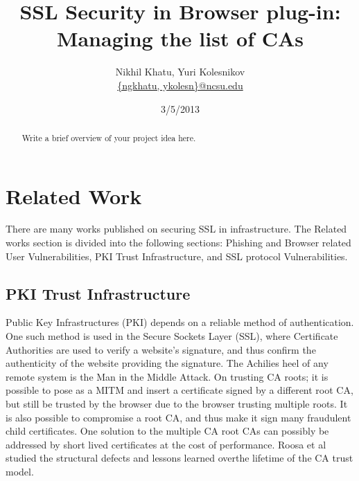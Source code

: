 \documentclass[10pt,twocolumn,pdftex]{article}
\title{SSL Security in Browser plug-in: Managing the list of CAs}
\author{Nikhil Khatu, Yuri Kolesnikov \\
\url{{ngkhatu, ykolesn}@ncsu.edu}}
\date{3/5/2013}
\begin{document}
\maketitle

\begin{abstract}
  Write a brief overview of your project idea here.
\end{abstract}

\newpage
\hspace{1em}
\newpage

\section{Related Work}

There are many works published on securing SSL in infrastructure. The Related works section is divided into the following sections: Phishing and Browser related User Vulnerabilities, PKI Trust Infrastructure, and SSL protocol Vulnerabilities.

\subsection{PKI Trust Infrastructure}

Public Key Infrastructures (PKI) depends on a reliable method of authentication.  One such method is used in the Secure Sockets Layer (SSL), where Certificate Authorities are used to verify a website's signature, and thus confirm the authenticity of the website providing the signature.  The Achilies heel of any remote system is the Man in the Middle Attack. On trusting CA roots; it is possible to pose as a MITM and insert a certificate signed by a different root CA, but still be trusted by the browser due to the browser trusting multiple roots. \cite{hayesMasquarading}  It is also possible to compromise a root CA, and thus make it sign many fraudulent child certificates. \cite{park2012web} One solution to the multiple CA root CAs can possibly be addressed by short lived certificates at the cost of performance. \cite{topalovicShortLivedCerts} Roosa et al studied the structural defects and lessons learned overthe lifetime of the CA trust model. \cite{roosaTrustDarknet} 
\end{document}
